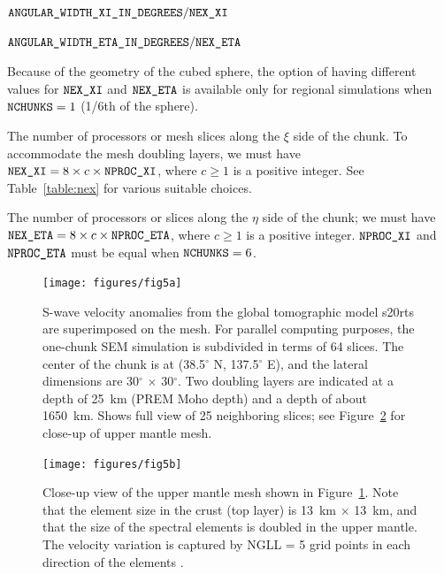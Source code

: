 \documentclass[oneside,english]{book}
\newenvironment{lyxcode}
{\begin{list}{}{
\setlength{\rightmargin}{\leftmargin}
\setlength{\listparindent}{0pt}%
\raggedright
\setlength{\itemsep}{0pt}
\setlength{\parsep}{0pt}
\normalfont\ttfamily}%
 \item[]}
{\end{list}}
\newcommand{\nexxi}{\mbox{\texttt{NEX\_XI}}}
\newcommand{\nexeta}{\mbox{\texttt{NEX\_ETA}}}
\newcommand{\nprocxi}{\mbox{\texttt{NPROC\_XI}}}
\newcommand{\nproceta}{\mbox{\texttt{NPROC\_ETA}}}
\newcommand{\nchunks}{\mbox{\texttt{NCHUNKS}}}
\begin{document}
\begin{description}
\begin{lyxcode}
$\texttt{ANGULAR\_WIDTH\_XI\_IN\_DEGREES}/\nexxi$

$\texttt{ANGULAR\_WIDTH\_ETA\_IN\_DEGREES}/\nexeta$~
\end{lyxcode}
Because of the geometry of the cubed sphere, the option of having
different values for $\nexxi$ and $\nexeta$ is available only for
regional simulations when $\nchunks=1$ (1/6th of the sphere).

\item [{$\nprocxi$}] The number of processors or mesh slices along the
$\xi$ side of the chunk. To accommodate the mesh doubling layers,
we must have $\nexxi=8\times c\times\nprocxi$, where $c\ge1$ is
a positive integer. See Table~\ref{table:nex} for various suitable
choices.
\item [{$\nproceta$}] The number of processors or slices along the $\eta$
side of the chunk; we must have $\nexeta=8\times c\times\nproceta$,
where $c\ge1$ is a positive integer. $\nprocxi$ and $\nproceta$
must be equal when $\nchunks=6$.
\end{description}
%
\begin{figure}[H]
\begin{centering}
\texttt{[image: figures/fig5a]}
\par\end{centering}

\caption{\textbf{\label{fig:3D-spectral-element-mesh}}S-wave velocity anomalies
from the global tomographic model s20rts \citep{RiVa00} are superimposed
on the mesh. For parallel computing purposes, the one-chunk SEM simulation
is subdivided in terms of 64 slices. The center of the chunk is at
(38.5$^{\circ}$ N, 137.5$^{\circ}$ E), and the lateral dimensions
are 30$^{\circ}$ $\times$ 30$^{\circ}$. Two doubling layers are
indicated at a depth of 25~km (PREM Moho depth) and a depth of about
1650~km. Shows full view of 25 neighboring slices; see Figure~\ref{fig:Close-up-view-of}
for close-up of upper mantle mesh.}

\end{figure}
%
\begin{figure}[H]
\begin{centering}
\texttt{[image: figures/fig5b]}
\par\end{centering}

\caption{\textbf{\label{fig:Close-up-view-of}}Close-up view of the upper mantle
mesh shown in Figure~\ref{fig:3D-spectral-element-mesh}. Note that
the element size in the crust (top layer) is 13~km $\times$ 13~km,
and that the size of the spectral elements is doubled in the upper
mantle. The velocity variation is captured by NGLL = 5 grid points
in each direction of the elements \citep{KoTr02a,KoTr02b}.}

\end{figure}
\end{document}
